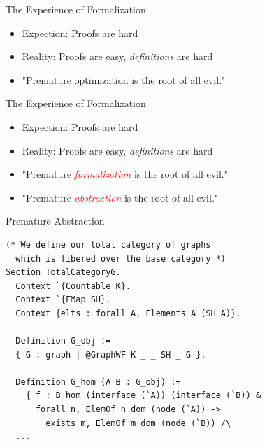 \documentclass{beamer}
\begin{document}
\begin{frame}{The Experience of Formalization}
  \pause
  \begin{itemize}
    \item Expection: Proofs are hard
    \pause
    \item Reality: Proofs are easy, \textit{definitions} are hard
    \pause
    \item "Premature optimization is the root of all evil."
  \end{itemize}
\end{frame}

\begin{frame}{The Experience of Formalization}
  \begin{itemize}
    \item Expection: Proofs are hard
    \item Reality: Proofs are easy, \textit{definitions} are hard
    \item "Premature \textit{\textcolor{red}{formalization}} is the root of all evil."
    \pause
    \item "Premature \textit{\textcolor{red}{abstraction}} is the root of all evil."
  \end{itemize}
\end{frame}

\begin{frame}[fragile]{Premature Abstraction}
  \begin{lstlisting}[language=Coq]
(* We define our total category of graphs 
  which is fibered over the base category *)
Section TotalCategoryG.
  Context `{Countable K}.
  Context `{FMap SH}.
  Context {elts : forall A, Elements A (SH A)}.

  Definition G_obj := 
  { G : graph | @GraphWF K _ _ SH _ G }.

  Definition G_hom (A B : G_obj) := 
    { f : B_hom (interface (`A)) (interface (`B)) &
      forall n, ElemOf n dom (node (`A)) ->
        exists m, ElemOf m dom (node (`B)) /\
  ...
  \end{lstlisting}
\end{frame}
\end{document}

